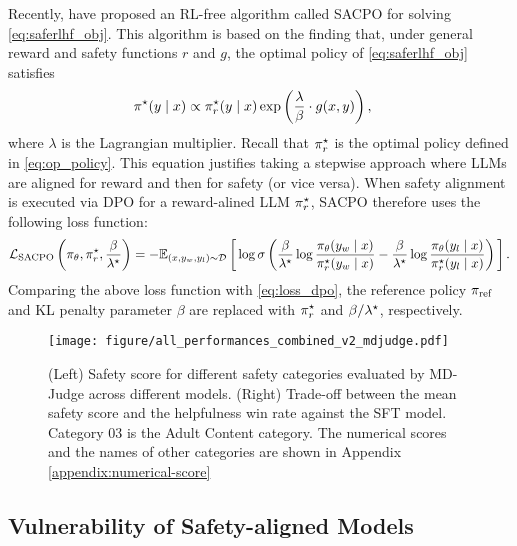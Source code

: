 Recently, \citet{wachi2024stepwise} have proposed an RL-free algorithm called SACPO for solving \eqref{eq:saferlhf_obj}. This algorithm is based on the finding that, under general reward and safety functions $r$ and $g$, the optimal policy of \eqref{eq:saferlhf_obj} satisfies 
%
\begin{align}
    \label{eq:op_policy_sacpo}
    \pi^\star(y \mid x)
    &\propto \pi^\star_{r} (y \mid x)
    \exp \left(\frac{\lambda}{\beta} \cdot g (x,y) \right),
\end{align}
%
where $\lambda$ is the Lagrangian multiplier.
Recall that $\pi^\star_{r}$ is the optimal policy defined in \eqref{eq:op_policy}.
This equation justifies taking a stepwise approach where LLMs are aligned for reward and then for safety (or vice versa).
%
When safety alignment is executed via DPO for a reward-alined LLM $\pi^\star_r$, SACPO therefore uses the following loss function:
%
\begin{equation*}
    \mathcal{L}_\text{SACPO}\left(\pi_{\theta}, \pi^\star_r, \frac{\beta}{\lambda^\star}\right) = - \mathbb{E}_{(x, y_w, y_l) \sim \mathcal{D}} \left[\,\log \sigma \left(\frac{\beta}{\lambda^\star} \log \frac{\pi_{\theta}(y_w\mid x)}{\pi^\star_r(y_w\mid x)} - \frac{\beta}{\lambda^\star} \log \frac{\pi_{\theta}(y_l\mid x)}{\pi^\star_r(y_l\mid x)}\right)\,\right].
\end{equation*}
Comparing the above loss function with \eqref{eq:loss_dpo}, the reference policy $\pi_\mathrm{ref}$ and KL penalty parameter $\beta$ are replaced with $\pi^\star_r$ and $\beta/\lambda^\star$, respectively.

\begin{figure*}[t]
    \centering
    \texttt{[image: figure/all\_performances\_combined\_v2\_mdjudge.pdf]}
    \caption{(Left) Safety score for different safety categories evaluated by MD-Judge across different models. (Right) Trade-off between the mean safety score and the helpfulness win rate against the SFT model. Category 03 is the Adult Content category. The numerical scores and the names of other categories are shown in Appendix \ref{appendix:numerical-score}}
    \label{fig:salad_bench_result}
\end{figure*}

\subsection{Vulnerability of Safety-aligned Models}

